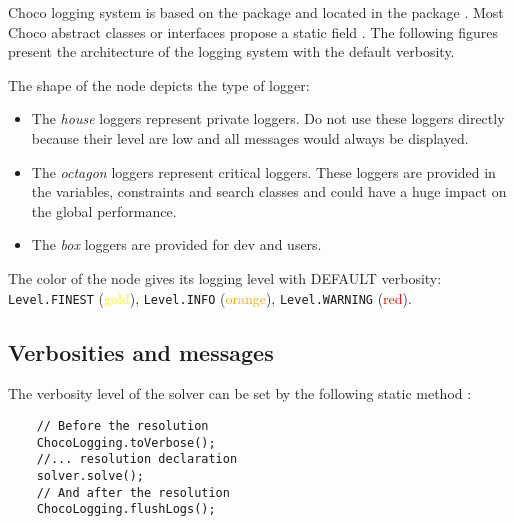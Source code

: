 Choco logging system is based on the  package and located in the package .
Most Choco abstract classes or interfaces propose a static field .
The following figures present the architecture of the logging system with the default verbosity.


The shape of the node depicts the type of logger:
\begin{itemize}
	\item The \emph{house} loggers represent private loggers. Do not use these loggers directly because their level are low and all messages would always be displayed.
	\item The \emph{octagon} loggers represent critical loggers. These loggers are provided in the variables, constraints and search classes and could have a huge impact on the global performance.
	\item The \emph{box} loggers are provided for dev and users.
\end{itemize}
The color of the node gives its logging level with DEFAULT verbosity:
\texttt{Level.FINEST} (\textcolor{yellow}{gold}),
\texttt{Level.INFO} (\textcolor{orange}{orange}),
\texttt{Level.WARNING} (\textcolor{red}{red}).

\subsection{Verbosities and messages}\label{solver:verbosityandmessages}\hypertarget{solver:verbosityandmessages}{}

The verbosity level of the solver can be set by the following static method :

\begin{lstlisting}
	// Before the resolution
	ChocoLogging.toVerbose();
	//... resolution declaration
	solver.solve();
	// And after the resolution
	ChocoLogging.flushLogs();
\end{lstlisting}


